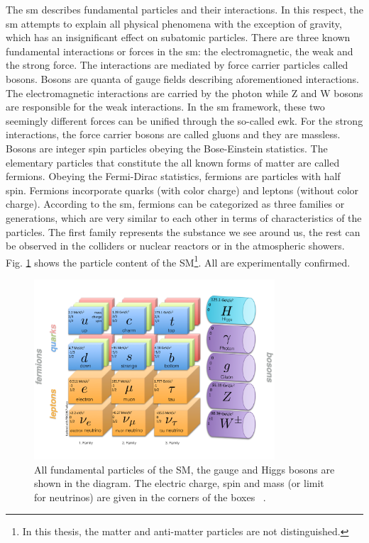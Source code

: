 The \acrshort{sm} describes fundamental particles and their interactions. In this respect, the \acrshort{sm} attempts to explain all physical phenomena with the exception of gravity, which has an insignificant effect on subatomic particles. There are three known fundamental interactions or forces in the \acrshort{sm}: the electromagnetic, the weak and the strong force. The interactions are mediated by force carrier particles called bosons. Bosons are quanta of gauge fields describing aforementioned interactions. The electromagnetic interactions are carried by the photon while Z and W bosons are responsible for the weak interactions. In the \acrshort{sm} framework, these two seemingly different forces can be unified through the so-called \acrfull{ewk}. For the strong interactions, the force carrier bosons are called gluons and they are massless. Bosons are integer spin particles obeying the Bose-Einstein statistics.
The elementary particles that constitute the all known forms of matter are called fermions.
Obeying the Fermi-Dirac statistics, fermions are particles with half spin.  Fermions incorporate quarks (with color charge) and leptons (without color charge). According to the \acrshort{sm}, fermions can be categorized as three families or generations, which are very similar to each other in terms of characteristics of the particles. The first family represents the substance we see around us, the rest can be observed in the colliders or nuclear reactors or in the atmospheric showers.   
Fig. \ref{fig:SM_particles} shows the particle content  of the SM\footnote{ In this thesis, the matter and anti-matter particles are not distinguished.}. All are experimentally confirmed. 
\begin{figure}[!h]
\centering
  \includegraphics[width=0.8\textwidth]{Plots/SM/SM_eng}
  \caption[Fundamental particles of the SM]{ All fundamental particles of the SM, the gauge and Higgs bosons are shown in the diagram. The electric charge, spin and mass (or limit for neutrinos) are given in the corners of the boxes ~\cite{Olive:2016xmw}.
  }
  \label{fig:SM_particles}
\end{figure}
